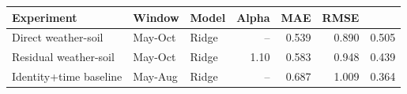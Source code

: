 \begin{tabular}{lllrrrr}
\toprule
Experiment & Window & Model & Alpha & MAE & RMSE & \Rsq{} \\
\midrule
Direct weather-soil & May-Oct & Ridge & -- & 0.539 & 0.890 & 0.505 \\
Residual weather-soil & May-Oct & Ridge & 1.10 & 0.583 & 0.948 & 0.439 \\
Identity+time baseline & May-Aug & Ridge & -- & 0.687 & 1.009 & 0.364 \\
\bottomrule
\end{tabular}
